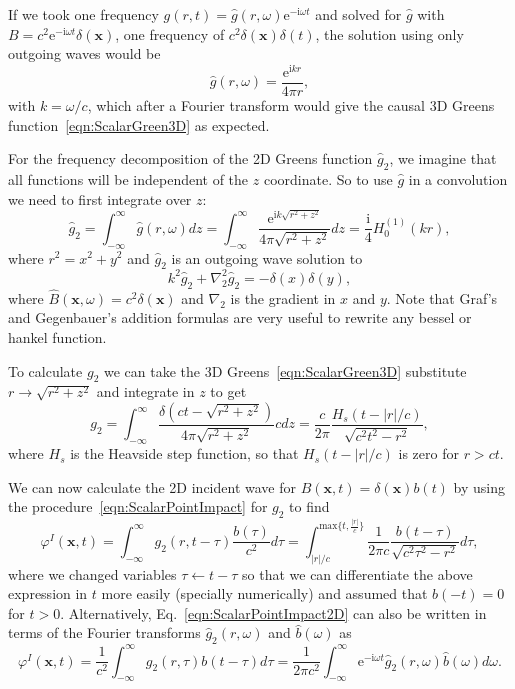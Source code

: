 \documentclass[ 12pt, a4paper]{article}
\newcommand{\be}{\begin{equation}}
\newcommand{\en}{\end{equation}}
\newcommand{\ii}{\textrm{i}}
\newcommand{\ee}{\textrm{e}}
\renewcommand{\vec}[1]{\boldsymbol{#1}}
\begin{document}
If we took one frequency $g(r,t) =  \hat g(r,\omega) \ee^{-\ii \omega t}$ and solved for $\hat g$ with $B = c^2 \ee^{- \ii \omega t} \delta(\vec x)$, one frequency of $c^2 \delta(\vec x) \delta(t)$, the solution using only outgoing waves would be
\be
\hat g(r, \omega) = \frac{\ee^{\ii k r}}{4 \pi r},
\en
 with $k = \omega /c$, which after a Fourier transform would give the causal 3D Greens function~\eqref{eqn:ScalarGreen3D} as expected.

For the frequency decomposition of the 2D Greens function $\hat g_2$, we imagine that all functions will be independent of the $z$ coordinate. So to use $\hat g$ in a convolution we need to first integrate over $z$:
\be
\hat g_2 = \int_{-\infty}^\infty \hat g(r, \omega) dz =  \int_{-\infty}^\infty \frac{\ee^{\ii k \sqrt{ r^2 + z^2} }}{4 \pi \sqrt{ r^2 + z^2}} dz = \frac{\ii}{4}H_0^{(1)}(k r),
\en
where $r^2 = x^2 + y^2$ and $\hat g_2$ is an outgoing wave solution to
\be
 k^2 \hat g_2 + \nabla^2_2 \hat g_2 = - \delta(x)\delta(y),
\en
where $\hat B(\vec x , \omega) = c^2 \delta(\vec x)$ and $\nabla_2$ is the gradient in $x$ and $y$. Note that Graf's and Gegenbauer's addition formulas are very useful to rewrite any bessel or hankel function.

To calculate $g_2$ we can take the 3D Greens~\eqref{eqn:ScalarGreen3D} substitute $r \to \sqrt{r^2 + z^2}$ and integrate in $z$ to get
\be
g_2 = \int_{-\infty}^{\infty} \frac{\delta(c t - \sqrt{r^2 + z^2})}{4 \pi \sqrt{r^2 + z^2}} c dz = \frac{c}{2 \pi} \frac{H_s(t -|r|/c)}{\sqrt{c^2 t^2 - r^2}},
\en
where $H_s$ is the Heavside step function, so that $H_s(t-|r|/c)$ is zero for $r > ct$.

We can now calculate the 2D incident wave for $B(\vec x,t) = \delta(\vec x) b (t)$ by using the procedure~\eqref{eqn:ScalarPointImpact} for $g_2$ to find
\be
\varphi^I(\vec x,t) =
 \int_{-\infty}^{\infty} g_2(r ,t -\tau) \frac{b(\tau)}{c^2}  d\tau = \int_{|r|/c}^{\text{max} \{t, \frac{|r|}{c}\} } \frac{1}{2 \pi c} \frac{b(t-\tau)}{\sqrt{c^2 \tau^2 - r^2}}  d\tau,
\label{eqn:ScalarPointImpact2D}
\en
where we changed variables $\tau \leftarrow t -\tau$ so that we can differentiate the above expression in $t$ more easily (specially numerically) and assumed that $b(-t) =0$ for $t>0$.
Alternatively,  Eq.~\eqref{eqn:ScalarPointImpact2D} can also be written in terms of the Fourier transforms $\hat g_2(r, \omega)$ and $\hat b(\omega)$ as
\be
\varphi^I(\vec x,t) =
 \frac{1}{c^2} \int_{-\infty}^{\infty}  g_2(r ,\tau) b(t -\tau)  d\tau = \frac{1}{2 \pi c^2} \int_{-\infty}^{\infty} \ee^{-\ii \omega t}  \hat g_2(r ,\omega) \hat b(\omega)  d \omega.
\label{eqn:ConvolutionWithGreen2D}
\en
\end{document}
